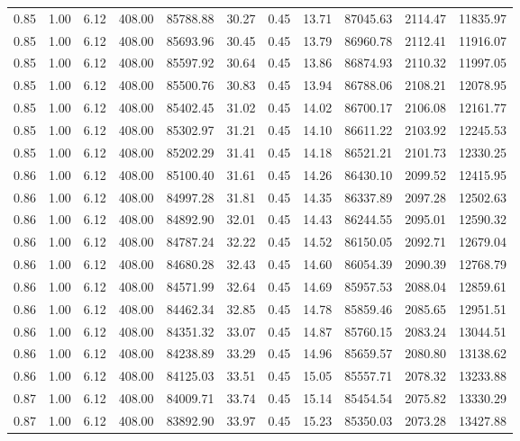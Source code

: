 \begin{table}[!ht]
\begin{tabular}{rrrrrrrrrrr}
0.85 & 1.00 & 6.12 & 408.00 & 85788.88 & 30.27 & 0.45 & 13.71 & 87045.63 & 2114.47 & 11835.97 \\
0.85 & 1.00 & 6.12 & 408.00 & 85693.96 & 30.45 & 0.45 & 13.79 & 86960.78 & 2112.41 & 11916.07 \\
0.85 & 1.00 & 6.12 & 408.00 & 85597.92 & 30.64 & 0.45 & 13.86 & 86874.93 & 2110.32 & 11997.05 \\
0.85 & 1.00 & 6.12 & 408.00 & 85500.76 & 30.83 & 0.45 & 13.94 & 86788.06 & 2108.21 & 12078.95 \\
0.85 & 1.00 & 6.12 & 408.00 & 85402.45 & 31.02 & 0.45 & 14.02 & 86700.17 & 2106.08 & 12161.77 \\
0.85 & 1.00 & 6.12 & 408.00 & 85302.97 & 31.21 & 0.45 & 14.10 & 86611.22 & 2103.92 & 12245.53 \\
0.85 & 1.00 & 6.12 & 408.00 & 85202.29 & 31.41 & 0.45 & 14.18 & 86521.21 & 2101.73 & 12330.25 \\
0.86 & 1.00 & 6.12 & 408.00 & 85100.40 & 31.61 & 0.45 & 14.26 & 86430.10 & 2099.52 & 12415.95 \\
0.86 & 1.00 & 6.12 & 408.00 & 84997.28 & 31.81 & 0.45 & 14.35 & 86337.89 & 2097.28 & 12502.63 \\
0.86 & 1.00 & 6.12 & 408.00 & 84892.90 & 32.01 & 0.45 & 14.43 & 86244.55 & 2095.01 & 12590.32 \\
0.86 & 1.00 & 6.12 & 408.00 & 84787.24 & 32.22 & 0.45 & 14.52 & 86150.05 & 2092.71 & 12679.04 \\
0.86 & 1.00 & 6.12 & 408.00 & 84680.28 & 32.43 & 0.45 & 14.60 & 86054.39 & 2090.39 & 12768.79 \\
0.86 & 1.00 & 6.12 & 408.00 & 84571.99 & 32.64 & 0.45 & 14.69 & 85957.53 & 2088.04 & 12859.61 \\
0.86 & 1.00 & 6.12 & 408.00 & 84462.34 & 32.85 & 0.45 & 14.78 & 85859.46 & 2085.65 & 12951.51 \\
0.86 & 1.00 & 6.12 & 408.00 & 84351.32 & 33.07 & 0.45 & 14.87 & 85760.15 & 2083.24 & 13044.51 \\
0.86 & 1.00 & 6.12 & 408.00 & 84238.89 & 33.29 & 0.45 & 14.96 & 85659.57 & 2080.80 & 13138.62 \\
0.86 & 1.00 & 6.12 & 408.00 & 84125.03 & 33.51 & 0.45 & 15.05 & 85557.71 & 2078.32 & 13233.88 \\
0.87 & 1.00 & 6.12 & 408.00 & 84009.71 & 33.74 & 0.45 & 15.14 & 85454.54 & 2075.82 & 13330.29 \\
0.87 & 1.00 & 6.12 & 408.00 & 83892.90 & 33.97 & 0.45 & 15.23 & 85350.03 & 2073.28 & 13427.88 \\

\end{tabular}
\end{table}

